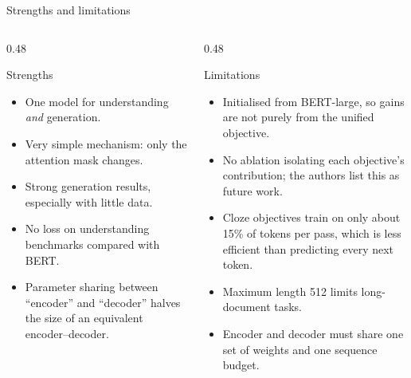 \documentclass[aspectratio=169,11pt]{beamer}
\begin{document}
\begin{frame}{Strengths and limitations}
  \begin{columns}[T]
    \begin{column}{0.48\textwidth}
      \begin{exampleblock}{Strengths}
        \small
        \begin{itemize}
          \item One model for understanding \emph{and} generation.
          \item Very simple mechanism: only the attention mask changes.
          \item Strong generation results, especially with little data.
          \item No loss on understanding benchmarks compared with BERT.
          \item Parameter sharing between ``encoder'' and ``decoder'' halves the size of an equivalent encoder--decoder.
        \end{itemize}
      \end{exampleblock}
    \end{column}
    \begin{column}{0.48\textwidth}
      \begin{alertblock}{Limitations}
        \small
        \begin{itemize}
          \item Initialised from BERT-large, so gains are not purely from the unified objective.
          \item No ablation isolating each objective's contribution; the authors list this as future work.
          \item Cloze objectives train on only about 15\% of tokens per pass, which is less efficient than predicting every next token.
          \item Maximum length 512 limits long-document tasks.
          \item Encoder and decoder must share one set of weights and one sequence budget.
        \end{itemize}
      \end{alertblock}
    \end{column}
  \end{columns}
\end{frame}
\end{document}
